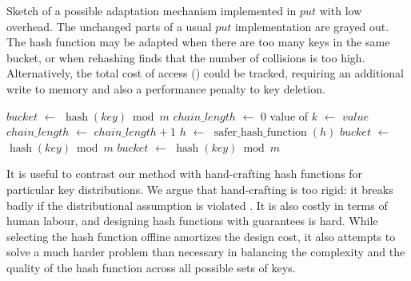 \documentclass[sigconf]{acmart}
\newcommand*\Let[2]{\State #1 $\gets$ #2}
\renewcommand{\label}[1]{%
    \gdef\sfname{sf:##1}}%
\begin{document}
\begin{algorithm}[t]
  \caption{\small Sketch of a possible adaptation mechanism implemented in $\mathit{put}$ with low overhead. The unchanged parts of a usual $\mathit{put}$ implementation are \textcolor{gray!100}{grayed out}. The hash function may be adapted when there are too many keys in the same bucket, or when rehashing finds that the number of collisions is too high. Alternatively, the total cost of access () could be tracked, requiring an additional write to memory and also a performance penalty to key deletion.}
  \label{alg:puthash}
  \begin{algorithmic}[1]
    \color{gray!100}
      \Let{$\mathit{bucket}$}{$\operatorname{hash}(\mathit{key}) \bmod m$}
      \color{mglred}
      \Let{$\mathit{chain\_length}$}{$0$}
      \color{gray!100}
            \Let{value of $k$}{$\mathit{value}$}
            \State\Return
          \EndIf
        \EndIf
        \color{mglred}
        \Let{$\mathit{chain\_length}$}{$\mathit{chain\_length} + 1$}
        \color{gray!100}
      \EndFor
      \color{mglred}
        \Let{$h$}{$\operatorname{safer\_hash\_function}(h)$}
        \Let{$\mathit{bucket}$}{$\operatorname{hash}(\mathit{key}) \bmod m$}
      \EndIf
      \color{gray!100}
        \color{mglred}
          \Let{$\mathit{bucket}$}{$\operatorname{hash}(\mathit{key}) \bmod m$}
        \EndIf
        \color{gray!100}
      \EndIf
    \EndFunction
  \end{algorithmic}
\end{algorithm}

It is useful to contrast our method with hand-crafting hash functions for particular key distributions.
We argue that hand-crafting is too rigid: it breaks badly if the distributional assumption is violated \citep{jdkhashbug,jdkstringhashsubsampling}.
It is also costly in terms of human labour, and designing hash functions with guarantees is hard.
While selecting the hash function offline amortizes the design cost, it also attempts to solve a much harder problem than necessary in balancing the complexity and the quality of the hash function across all possible sets of keys.
\end{document}

